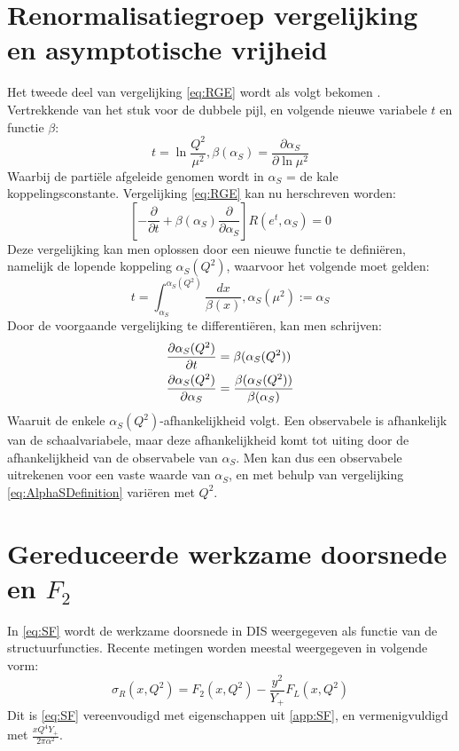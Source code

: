 \documentclass[a4paper,11pt]{article}
\numberwithin{equation}{section} %
\begin{document}
\section{Renormalisatiegroep vergelijking en asymptotische vrijheid} \label{app:RGE}
Het tweede deel van vergelijking \eqref{eq:RGE} wordt als volgt bekomen \cite{Ellis}.
Vertrekkende van het stuk voor de dubbele pijl, en volgende nieuwe variabele $t$ en functie $\beta$:
\begin{equation}
t = \ln{\frac{Q^2}{\mu^2}}, \beta(\alpha_S) =  \frac{\partial \alpha_S}{\partial \ln{\mu^2}}
\end{equation}
Waarbij de partiële afgeleide genomen wordt in $\alpha_S$ = de kale koppelingsconstante.
Vergelijking \eqref{eq:RGE} kan nu herschreven worden:
\begin{equation}
\left[ -\frac{\partial}{\partial t} + \beta(\alpha_S) \frac{\partial}{\partial \alpha_S} \right] R(e^t, \alpha_S) = 0
\end{equation}
Deze vergelijking kan men oplossen door een nieuwe functie te definiëren, namelijk de lopende koppeling $\alpha_S(Q^2)$, waarvoor het volgende moet gelden:
\begin{equation} \label{eq:AlphaSDefinition}
t = \int_{\alpha_S}^{\alpha_S(Q^2)} \frac{dx}{\beta(x)}, \alpha_S(\mu^2) := \alpha_S
\end{equation}
Door de voorgaande vergelijking te differentiëren, kan men schrijven:
\begin{align}
\frac{\partial \alpha_S(Q^2)}{\partial t} &= \beta( \alpha_S(Q^2) ) \notag \\ \frac{\partial \alpha_S(Q^2)}{\partial \alpha_S} &= \frac{\beta(\alpha_S(Q^2))}{\beta(\alpha_S)}
\end{align}
Waaruit de enkele $\alpha_S(Q^2)$-afhankelijkheid volgt.
Een observabele is afhankelijk van de schaalvariabele, maar deze afhankelijkheid komt tot uiting door de afhankelijkheid van de observabele van $\alpha_S$.
Men kan dus een observabele uitrekenen voor een vaste waarde van $\alpha_S$, en met behulp van vergelijking \eqref{eq:AlphaSDefinition} variëren met $Q^2$.

\section{Gereduceerde werkzame doorsnede en $F_2$} \label{app:SigmaR}
In \eqref{eq:SF} wordt de werkzame doorsnede in DIS weergegeven als functie van de structuurfuncties.
Recente metingen worden meestal weergegeven in volgende vorm:
\begin{equation}
\sigma_{R} (x, Q^2) = F_2(x,Q^2)-\frac{y^2}{Y_+} F_L(x,Q^2)
\end{equation}
Dit is \eqref{eq:SF} vereenvoudigd met eigenschappen uit \ref{app:SF}, en vermenigvuldigd met $\frac{xQ^4 Y_+}{2\pi \alpha^2}$.
\end{document}
